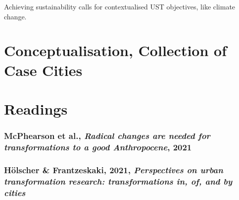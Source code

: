 \documentclass{article}
\begin{document}
Achieving sustainability calls for contextualised UST objectives, like climate change.

\subsection{}

\section{Conceptualisation, Collection of Case Cities}

\pagebreak

\section{Readings}

\subsubsection{McPhearson et al., \textit{Radical changes are needed for transformations to a good Anthropocene}, 2021}

\subsubsection{Hölscher \& Frantzeskaki, 2021, \textit{Perspectives on urban transformation research: transformations in, of, and by cities}}
\end{document}
